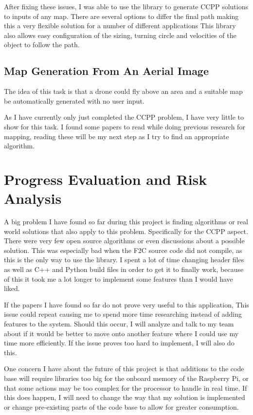 \documentclass[progress]{cmpreport}
\begin{document}
After fixing these issues, I was able to use the library to generate CCPP solutions to inputs of any map.
There are several options to differ the final path making this a very flexible solution for a number of different applications
This library also allows easy configuration of the sizing, turning circle and velocities of the object to follow the path.

\subsection{Map Generation From An Aerial Image}
The idea of this task is that a drone could fly above an area and a suitable map be automatically generated with no user input.

As I have currently only just completed the CCPP problem, I have very little to show for this task.
I found some papers to read while doing previous research for mapping, reading these will be my next step as I try to find an appropriate algorithm.

\section{Progress Evaluation and Risk Analysis}
A big problem I have found so far during this project is finding algorithms or real world solutions that also apply to this problem.
Specifically for the CCPP aspect. There were very few open source algorithms or even discussions about a possible solution.
This was especially bad when the F2C source code did not compile, as this is the only way to use the library.
I spent a lot of time changing header files as well as C++ and Python build files in order to get it to finally work,
because of this it took me a lot longer to implement some features than I would have liked.

If the papers I have found so far do not prove very useful to this application,
This issue could repeat causing me to spend more time researching instead of adding features to the system.
Should this occur, I will analyze and talk to my team about if it would be better to move onto another feature where I could use my time more efficiently.
If the issue proves too hard to implement, I will also do this.

One concern I have about the future of this project is that additions to the code base will require libraries too big for the onboard memory of the Raspberry Pi,
or that some actions may be too complex for the processor to handle in real time.
If this does happen, I will need to change the way that my solution is implemented or change pre-existing parts of the code base to allow for greater consumption.
\end{document}
